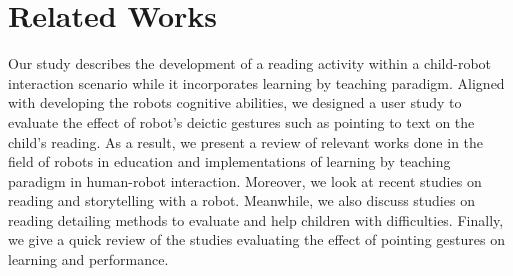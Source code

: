 \documentclass{sigchi}
\begin{document}
\section{Related Works}


Our study describes the development of a reading activity within a child-robot interaction scenario while it incorporates learning by teaching paradigm.
Aligned with developing the robots cognitive abilities, we designed a user study to evaluate the effect of robot's deictic gestures such as pointing to text on the child's reading. 
As a result, we present a review of relevant works done in the field of robots in education and implementations of learning by teaching paradigm in human-robot interaction. 
Moreover, we look at recent studies on reading and storytelling with a robot.
Meanwhile, we also discuss studies on reading detailing methods to evaluate and help children with difficulties.
Finally, we give a quick review of the studies evaluating the effect of pointing gestures on learning and performance.
\end{document}
